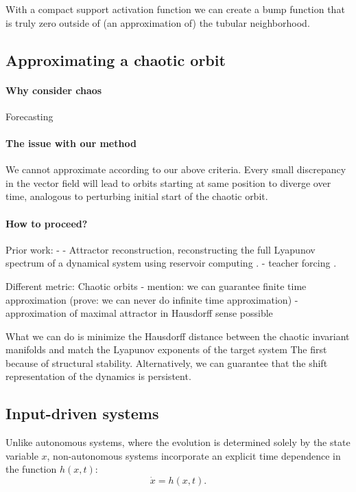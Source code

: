 \documentclass{article}
\theoremstyle{definition} \newtheorem{definition}{Definition}
\theoremstyle{remark} \newtheorem{remark}{Remark}
\newcounter{ct}
\begin{document}
With a compact support activation function we can create a bump function that is truly zero outside of (an approximation of) the tubular neighborhood.


\subsection{Approximating a chaotic orbit}\label{sec:chaos} 
\citep{pathak2017using}
\paragraph{Why consider chaos} 
Forecasting
\citep{jaeger2004harnessing}
\citep{fan2020long}
\citep{vlachas2020backpropagation}
\citep{grigoryeva2024forecasting}

\paragraph{The issue with our method} 
We cannot approximate according to our above criteria.
Every small discrepancy in the vector field will lead to orbits starting at same position to diverge over time, analogous to perturbing initial start of the chaotic orbit.


\paragraph{How to proceed?}
Prior work:
- \citep{dellnitz1999approximation}
- Attractor reconstruction, reconstructing the full Lyapunov spectrum of a dynamical system using reservoir computing \citep{hart2024attractor}.
- teacher forcing \citep{hess2023teacherforcing}.

Different metric: Chaotic orbits
- mention: we can guarantee finite time approximation (prove: we can never do infinite time approximation)
- approximation of maximal attractor in Hausdorff sense possible \citep{hess2023teacherforcing}

What we can do is minimize the Hausdorff distance between the chaotic invariant manifolds and match the Lyapunov exponents of the target system
The first because of structural stability.
%
Alternatively, we can guarantee that the shift representation of the dynamics is persistent.



\subsection{Input-driven systems}\label{sec:input_driven_app} 
Unlike autonomous systems, where the evolution is determined solely by the state variable $x$, non-autonomous systems incorporate an explicit time dependence in the function $h(x,t)$:
\begin{equation}
\dot x = h(x,t).
\end{equation}
\end{document}
